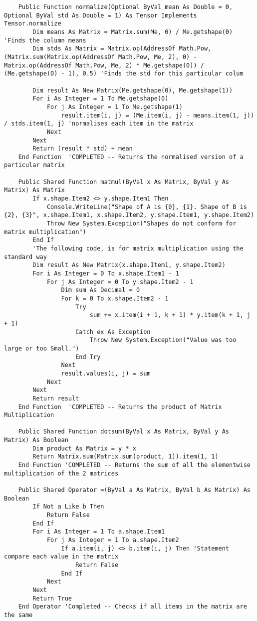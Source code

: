 \begin{verbatim}
    Public Function normalize(Optional ByVal mean As Double = 0, Optional ByVal std As Double = 1) As Tensor Implements Tensor.normalize
        Dim means As Matrix = Matrix.sum(Me, 0) / Me.getshape(0) 'Finds the column means
        Dim stds As Matrix = Matrix.op(AddressOf Math.Pow, (Matrix.sum(Matrix.op(AddressOf Math.Pow, Me, 2), 0) - Matrix.op(AddressOf Math.Pow, Me, 2) * Me.getshape(0)) / (Me.getshape(0) - 1), 0.5) 'Finds the std for this particular colum

        Dim result As New Matrix(Me.getshape(0), Me.getshape(1))
        For i As Integer = 1 To Me.getshape(0)
            For j As Integer = 1 To Me.getshape(1)
                result.item(i, j) = (Me.item(i, j) - means.item(1, j)) / stds.item(1, j) 'normalises each item in the matrix
            Next
        Next
        Return (result * std) + mean
    End Function  'COMPLETED -- Returns the normalised version of a particular matrix
    
    Public Shared Function matmul(ByVal x As Matrix, ByVal y As Matrix) As Matrix
        If x.shape.Item2 <> y.shape.Item1 Then
            Console.WriteLine("Shape of A is {0}, {1}. Shape of B is {2}, {3}", x.shape.Item1, x.shape.Item2, y.shape.Item1, y.shape.Item2)
            Throw New System.Exception("Shapes do not conform for matrix multiplication")
        End If
        'The following code, is for matrix multiplication using the standard way
        Dim result As New Matrix(x.shape.Item1, y.shape.Item2)
        For i As Integer = 0 To x.shape.Item1 - 1
            For j As Integer = 0 To y.shape.Item2 - 1
                Dim sum As Decimal = 0
                For k = 0 To x.shape.Item2 - 1
                    Try
                        sum += x.item(i + 1, k + 1) * y.item(k + 1, j + 1)
                    Catch ex As Exception
                        Throw New System.Exception("Value was too large or too Small.")
                    End Try
                Next
                result.values(i, j) = sum
            Next
        Next
        Return result
    End Function  'COMPLETED -- Returns the product of Matrix Multiplication
    
    Public Shared Function dotsum(ByVal x As Matrix, ByVal y As Matrix) As Boolean
        Dim product As Matrix = y * x
        Return Matrix.sum(Matrix.sum(product, 1)).item(1, 1)
    End Function 'COMPLETED -- Returns the sum of all the elementwise multiplication of the 2 matrices
    
    Public Shared Operator =(ByVal a As Matrix, ByVal b As Matrix) As Boolean
        If Not a Like b Then
            Return False
        End If
        For i As Integer = 1 To a.shape.Item1
            For j As Integer = 1 To a.shape.Item2
                If a.item(i, j) <> b.item(i, j) Then 'Statement compare each value in the matrix
                    Return False
                End If
            Next
        Next
        Return True
    End Operator 'Completed -- Checks if all items in the matrix are the same
    

\end{verbatim}
